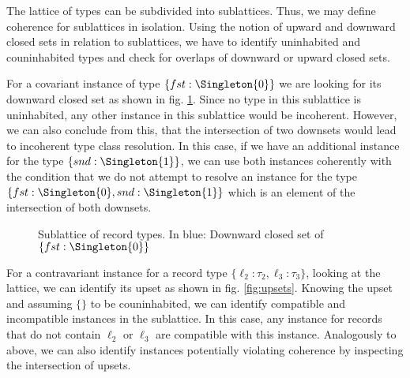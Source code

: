 The lattice of types can be subdivided into sublattices.
Thus, we may define coherence for sublattices in isolation.
Using the notion of upward and downward closed sets in relation to sublattices, we have to identify uninhabited and couninhabited types and check for overlaps of downward or upward closed sets.

For a covariant instance of type $\{ fst : \Singleton{0} \}$ we are looking for its downward closed set as shown in fig. \ref{fig:downset}.
Since no type in this sublattice is uninhabited, any other instance in this sublattice would be incoherent.
However, we can also conclude from this, that the intersection of two downsets would lead to incoherent type class resolution.
In this case, if we have an additional instance for the type $\{ snd : \Singleton{1} \}$, we can use both instances coherently
with the condition that we do not attempt to resolve an instance for the type $\{ fst : \Singleton{0}, snd : \Singleton{1} \}$ which is an element of the intersection of both downsets.

\begin{figure}[ht]
  \centering
  \caption{Sublattice of record types. In {\color{blue}blue}: Downward closed set of $\{ fst : \Singleton{0} \}$}
  \label{fig:downset}
\end{figure}


For a contravariant instance for a record type $\{ \ell_2 : \tau_2, \ell_3 : \tau_3 \}$, looking at the lattice, we can identify its upset as shown in fig. \ref{fig:upsets}.
Knowing the upset and assuming $\{\}$ to be couninhabited, we can identify compatible and incompatible instances in the sublattice.
In this case, any instance for records that do not contain $\ell_2$ or $\ell_3$ are compatible with this instance.
Analogously to above, we can also identify instances potentially violating coherence by inspecting the intersection of upsets.

